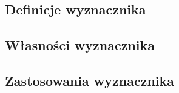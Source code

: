\subsection{Definicje wyznacznika}


\subsection{Własności wyznacznika}


\subsection{Zastosowania wyznacznika}


\newpage